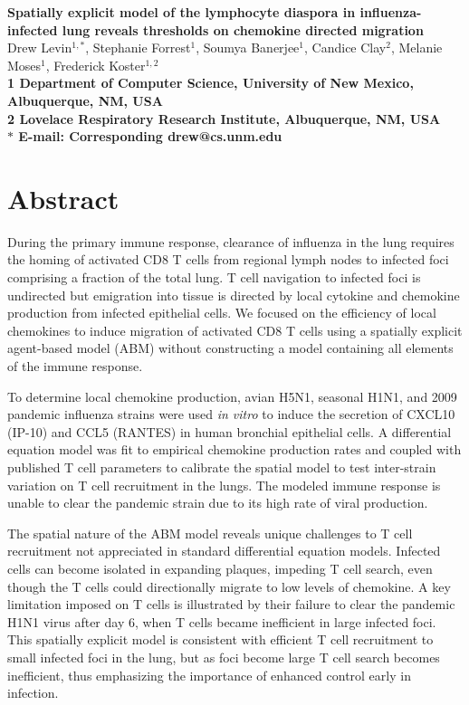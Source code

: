 \documentclass[10pt]{article}
\date{}
\begin{document}
\begin{flushleft}
{\Large
\textbf{Spatially explicit model of the lymphocyte diaspora in influenza-infected lung reveals thresholds on chemokine directed migration}
}
\\
Drew Levin$^{1,\ast}$, 
Stephanie Forrest$^{1}$, 
Soumya Banerjee$^{1}$,
Candice Clay$^{2}$, 
Melanie Moses$^{1}$, 
Frederick Koster$^{1,2}$
\\
\bf{1} Department of Computer Science, University of New Mexico, Albuquerque, NM, USA
\\
\bf{2} Lovelace Respiratory Research Institute, Albuquerque, NM, USA
\\
$\ast$ E-mail: Corresponding drew@cs.unm.edu
\end{flushleft}



\section*{Abstract}

During the primary immune response, clearance of influenza in the lung requires the homing of activated CD8 T cells from regional lymph nodes to infected foci comprising a fraction of the total lung.  T cell navigation to infected foci is undirected but emigration into tissue is directed by local cytokine and chemokine production from infected epithelial cells.  We focused on the efficiency of local chemokines to induce migration of activated CD8 T cells using a spatially explicit agent-based model (ABM) without constructing a model containing all elements of the immune response.  

To determine local chemokine production, avian H5N1, seasonal H1N1, and 2009 pandemic influenza strains were used \textit{in vitro} to induce the secretion of CXCL10 (IP-10) and CCL5 (RANTES) in human bronchial epithelial cells.  A differential equation model was fit to empirical chemokine production rates and coupled with published T cell parameters to calibrate the spatial model to test inter-strain variation on T cell recruitment in the lungs.  The modeled immune response is unable to clear the pandemic strain due to its high rate of viral production.  

The spatial nature of the ABM model reveals unique challenges to T cell recruitment not appreciated in standard differential equation models.  Infected cells can become isolated in expanding plaques, impeding T cell search, even though the T cells could directionally migrate to low levels of chemokine.  A key limitation imposed on T cells is illustrated by their failure to clear the pandemic H1N1 virus after day 6, when T cells became inefficient in large infected foci. This spatially explicit model is consistent with efficient T cell recruitment to small infected foci in the lung, but as foci become large T cell search becomes inefficient, thus emphasizing the importance of enhanced control early in infection.
\end{document}

